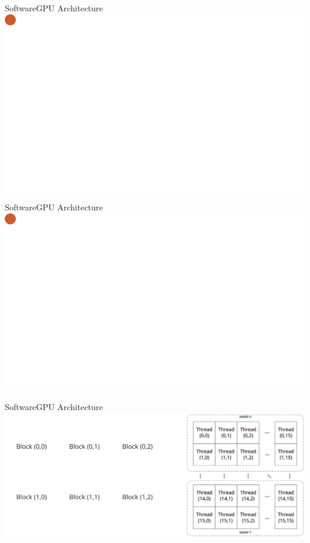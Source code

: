 \begin{frame}{Software}{GPU Architecture}
	\centering
	\includegraphics[width=0.6\paperwidth]{gfx/cores01}
\end{frame}

\begin{frame}{Software}{GPU Architecture}
\centering
\includegraphics[width=0.6\paperwidth]{gfx/cores02}
\end{frame}

\begin{frame}{Software}{GPU Architecture}
	\centering
	\includegraphics[width=0.9\paperwidth]{gfx/cudagrid}
\end{frame}

